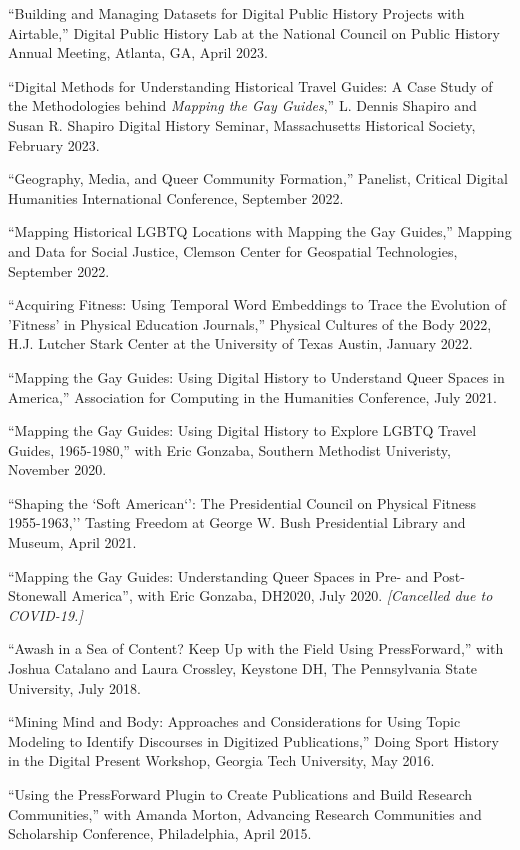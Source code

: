 \documentclass[11pt]{article}
\begin{document}
``Building and Managing Datasets for Digital Public History Projects with Airtable,'' Digital Public History Lab at the National Council on Public History Annual Meeting, Atlanta, GA, April 2023. 

``Digital Methods for Understanding Historical Travel Guides: A Case Study of the Methodologies behind \emph{Mapping the Gay Guides},'' L. Dennis Shapiro and Susan R. Shapiro Digital History Seminar, Massachusetts Historical Society, February 2023. 

``Geography, Media, and Queer Community Formation,'' Panelist, Critical Digital Humanities International Conference, September 2022.

``Mapping Historical LGBTQ Locations with Mapping the Gay Guides,'' Mapping and Data for Social Justice, Clemson Center for Geospatial Technologies, September 2022.

``Acquiring Fitness: Using Temporal Word Embeddings to Trace the Evolution of 'Fitness' in Physical Education Journals,'' Physical Cultures of the Body 2022, H.J. Lutcher Stark Center at the University of Texas Austin, January 2022.

``Mapping the Gay Guides: Using Digital History to Understand Queer Spaces in America,'' Association for Computing in the Humanities Conference, July 2021.

``Mapping the Gay Guides: Using Digital History to Explore LGBTQ Travel Guides, 1965-1980,'' with Eric Gonzaba, Southern Methodist Univeristy, November 2020.

``Shaping the `Soft American`': The Presidential Council on Physical Fitness 1955-1963,'' Tasting Freedom at George W. Bush Presidential Library and Museum, April 2021.

``Mapping the Gay Guides: Understanding Queer Spaces in Pre- and Post-Stonewall America'', with Eric Gonzaba, DH2020, July 2020. \emph{[Cancelled due to COVID-19.]}

``Awash in a Sea of Content? Keep Up with the Field Using PressForward,'' with Joshua Catalano and Laura Crossley, Keystone DH, The Pennsylvania State University, July 2018.

``Mining Mind and Body: Approaches and Considerations for Using Topic Modeling to Identify Discourses in Digitized Publications,'' Doing Sport History in the Digital Present Workshop, Georgia Tech University, May 2016.

``Using the PressForward Plugin to Create Publications and Build Research Communities,'' with Amanda Morton, Advancing Research Communities and Scholarship Conference, Philadelphia, April 2015.
\end{document}
